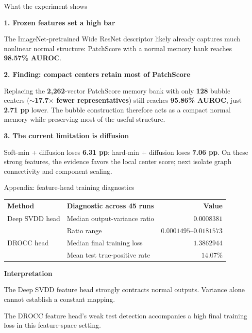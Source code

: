 \documentclass[aspectratio=169,professionalfonts,10pt]{beamer}
\def\phase{NBD}
\newcommand{\head}[1]{\par{\normalsize\bfseries\color{navy}#1}\par\vspace{2pt}}
\begin{document}
\def\phase{CONCLUSION}
\begin{frame}[t]{What the experiment shows}
\small
\vspace{.26cm}
\head{1. Frozen features set a high bar}
The ImageNet-pretrained Wide ResNet descriptor likely already captures much nonlinear normal structure: PatchScore with a normal memory bank reaches \textbf{98.57\% AUROC}.
\par\vspace{.30cm}
\head{2. Finding: compact centers retain most of PatchScore}
Replacing the \textbf{2,262}-vector PatchScore memory bank with only \textbf{128} bubble centers ($\sim$\textbf{17.7$\times$ fewer representatives}) still reaches \textbf{95.86\% AUROC}, just \textbf{2.71 pp} lower. The bubble construction therefore acts as a compact normal memory while preserving most of the useful structure.
\par\vspace{.30cm}
\head{3. The current limitation is diffusion}
Soft-min + diffusion loses \textbf{6.31 pp}; hard-min + diffusion loses \textbf{7.06 pp}. On these strong features, the evidence favors the local center score; next isolate graph connectivity and component scaling.
\end{frame}

\def\phase{APPENDIX}


\def\phase{APPENDIX}
\begin{frame}[t]{Appendix: feature-head training diagnostics}
\small
\vspace{.22cm}
\begin{center}
\renewcommand{\arraystretch}{1.5}
\begin{tabular}{llr}
\toprule
\textbf{Method} & \textbf{Diagnostic across 45 runs} & \textbf{Value}\\
\midrule
Deep SVDD head & Median output-variance ratio & $0.0008381$\\
& Ratio range & $0.0001495$--$0.0181573$\\
DROCC head & Median final training loss & $1.3862944$\\
& Mean test true-positive rate & $14.07\%$\\
\bottomrule
\end{tabular}
\end{center}
\vspace{.22cm}
\head{Interpretation}
The Deep SVDD feature head strongly contracts normal outputs. Variance alone cannot establish a constant mapping.
\par\vspace{.18cm}
The DROCC feature head's weak test detection accompanies a high final training loss in this feature-space setting.
\end{frame}
\end{document}
